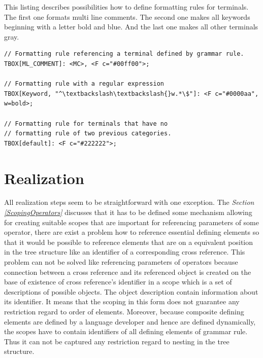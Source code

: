 \documentclass[12pt,notitlepage,a4paper]{report}
\begin{document}
\begin{expl}\label{TerminalFormattingRules}
This listing describes possibilities how to define formatting rules for terminals. The first one formats multi line comments. The second one makes all keywords beginning with a letter bold and blue. And the last one makes all other terminals gray.
\begingroup
\fontsize{10pt}{12pt}
\begin{Verbatim}[commandchars=\\\{\}]
// Formatting rule referencing a terminal defined by grammar rule.
TBOX[ML_COMMENT]: <MC>, <F c="#00ff00">;

// Formatting rule with a regular expression 
TBOX[Keyword, "^\textbackslash\textbackslash{}w.*\$"]: <F c="#0000aa", w=bold>;

// Formatting rule for terminals that have no
// formatting rule of two previous categories.
TBOX[default]: <F c="#222222">;

\end{Verbatim}
\endgroup
\end{expl}

\section{Realization}
\label{BoxModelRealization}
All realization steps seem to be straightforward with one exception. The \textit{Section \ref{ScopingOperators}} discusses that it has to be defined some mechanism allowing for creating suitable scopes that are important for referencing parameters of some operator, there are exist a problem how to reference essential defining elements so that it would be possible to reference elements that are on a equivalent position in the tree structure like an identifier of a corresponding cross reference. This problem can not be solved like referencing parameters of operators because connection between a cross reference and its referenced object is created on the base of existence of cross reference's identifier in a scope which is a set of descriptions of possible objects. The object description contain information about its identifier. It means that the scoping in this form does not guarantee any restriction regard to order of elements. Moreover, because composite defining elements are defined by a language developer and hence are defined dynamically, the scopes have to contain identifiers of all defining elements of grammar rule. Thus  it can not be captured any restriction regard to nesting in the tree structure.
\end{document}
